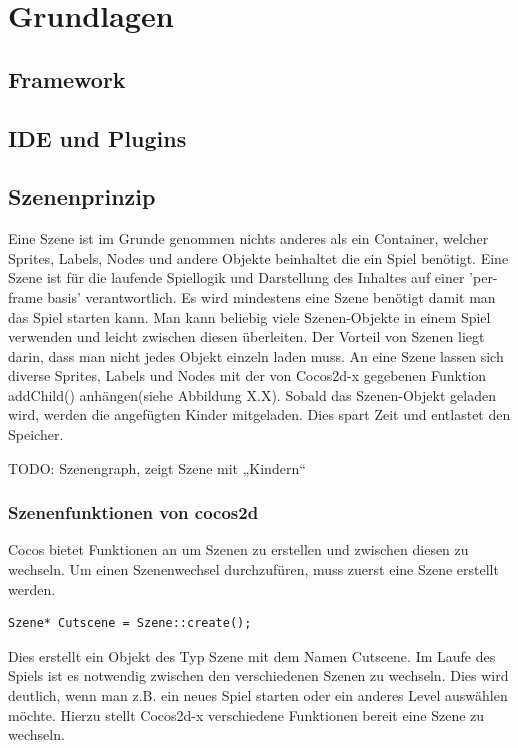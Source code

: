 \chapter{Grundlagen}

\section{Framework}\label{sec:2_Framework}



\section{IDE und Plugins}\label{sec:2_IDE}



\section{Szenenprinzip}\label{sec:2_Szenenprinzip}
Eine Szene ist im Grunde genommen nichts anderes als ein Container, welcher  Sprites, Labels, Nodes und andere Objekte beinhaltet die ein Spiel benötigt. Eine Szene ist für die laufende Spiellogik und Darstellung des Inhaltes auf einer 'per-frame basis' verantwortlich. Es wird mindestens eine Szene benötigt damit man das Spiel starten kann. Man kann beliebig viele Szenen-Objekte in einem Spiel verwenden und leicht zwischen diesen überleiten. Der Vorteil von Szenen liegt darin, dass man nicht jedes Objekt einzeln laden muss. An eine Szene lassen sich diverse Sprites, Labels und Nodes mit der von Cocos2d-x gegebenen Funktion addChild() anhängen(siehe Abbildung X.X). Sobald das Szenen-Objekt geladen wird, werden die angefügten Kinder mitgeladen. Dies spart Zeit und entlastet den Speicher.

TODO: Szenengraph, zeigt Szene mit „Kindern“

\subsection{Szenenfunktionen von cocos2d}

Cocos bietet Funktionen an um Szenen zu erstellen und zwischen diesen zu wechseln. Um einen Szenenwechsel durchzufüren, muss zuerst eine Szene erstellt werden.

\begin{lstlisting}[style=singleline]
	Szene* Cutscene = Szene::create();
\end{lstlisting}


Dies erstellt ein Objekt des Typ Szene mit dem Namen Cutscene.
Im Laufe des Spiels ist es  notwendig zwischen den verschiedenen Szenen zu wechseln. Dies wird deutlich, wenn man z.B. ein neues Spiel starten oder ein anderes Level auswählen möchte. Hierzu stellt Cocos2d-x verschiedene Funktionen bereit eine Szene zu wechseln.

